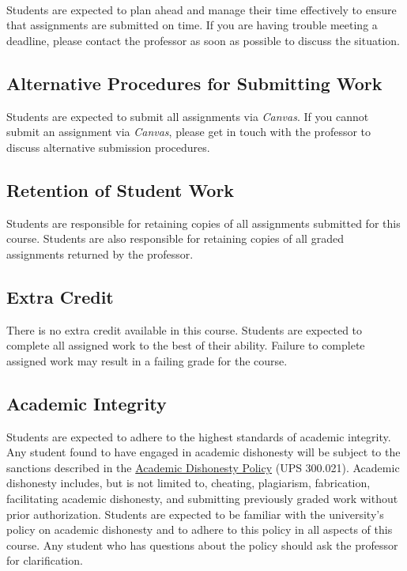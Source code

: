 \documentclass[11pt, letterpaper]{article}
\begin{document}
\paragraph{}Students are expected to plan ahead and manage their time effectively to ensure that assignments are submitted on time. If you are having trouble meeting a deadline, please contact the professor as soon as possible to discuss the situation.

\subsection*{Alternative Procedures for Submitting Work}
Students are expected to submit all assignments via \emph{Canvas}. If you cannot submit an assignment via \emph{Canvas}, please get in touch with the professor to discuss alternative submission procedures.

\subsection*{Retention of Student Work}
Students are responsible for retaining copies of all assignments submitted for this course. Students are also responsible for retaining copies of all graded assignments returned by the professor.

\subsection*{Extra Credit}
There is no extra credit available in this course. Students are expected to complete all assigned work to the best of their ability. Failure to complete assigned work may result in a failing grade for the course.

\subsection*{Academic Integrity}
Students are expected to adhere to the highest standards of academic integrity. Any student found to have engaged in academic dishonesty will be subject to the sanctions described in the \href{https://www.fullerton.edu/senate/publications_policies_resolutions/ups/UPS%20300/UPS%20300.021.pdf}{Academic Dishonesty Policy} (UPS 300.021). Academic dishonesty includes, but is not limited to, cheating, plagiarism, fabrication, facilitating academic dishonesty, and submitting previously graded work without prior authorization. Students are expected to be familiar with the university's policy on academic dishonesty and to adhere to this policy in all aspects of this course. Any student who has questions about the policy should ask the professor for clarification.
\end{document}
